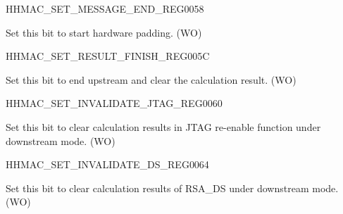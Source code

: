 \begin{register}{H}{HMAC\_SET\_MESSAGE\_END\_REG}{\hexprefix{}0058}\label{regdesc:HMACSETMESSAGEENDREG}
%
%
\regnewline%
\begin{regdesc}\begin{reglist}
\label{fielddesc:HMACSETTEXTEND}\item [HMAC\_SET\_TEXT\_END] Set this bit to start hardware padding. (WO)
\end{reglist}\end{regdesc}
\end{register}


\begin{register}{H}{HMAC\_SET\_RESULT\_FINISH\_REG}{\hexprefix{}005C}\label{regdesc:HMACSETRESULTFINISHREG}
%
%
\regnewline%
\begin{regdesc}\begin{reglist}
\label{fielddesc:HMACSETRESULTEND}\item [HMAC\_SET\_RESULT\_END] Set this bit to end upstream and clear the calculation result. (WO)
\end{reglist}\end{regdesc}
\end{register}


\begin{register}{H}{HMAC\_SET\_INVALIDATE\_JTAG\_REG}{\hexprefix{}0060}\label{regdesc:HMACSETINVALIDATEJTAGREG}
%
%
\regnewline%
\begin{regdesc}\begin{reglist}
\label{fielddesc:HMACSETINVALIDATEJTAG}\item [HMAC\_SET\_INVALIDATE\_JTAG] Set this bit to clear calculation results in JTAG re-enable function under downstream mode. (WO)
\end{reglist}\end{regdesc}
\end{register}


\begin{register}{H}{HMAC\_SET\_INVALIDATE\_DS\_REG}{\hexprefix{}0064}\label{regdesc:HMACSETINVALIDATEDSREG}
%
%
\regnewline%
\begin{regdesc}\begin{reglist}
\label{fielddesc:HMACSETINVALIDATEDS}\item [HMAC\_SET\_INVALIDATE\_DS] Set this bit to clear calculation results of RSA\_DS under downstream mode. (WO)
\end{reglist}\end{regdesc}
\end{register}


